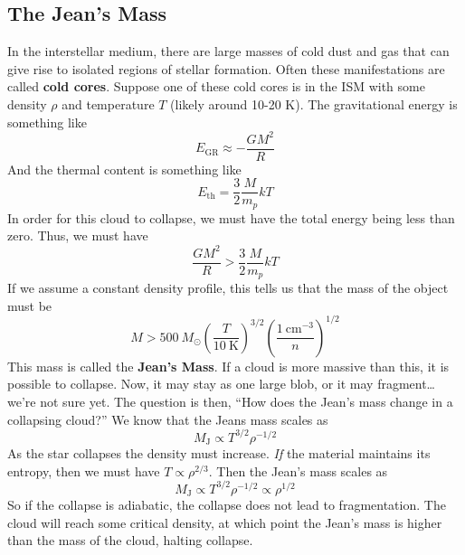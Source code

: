 \documentclass[10pt]{article}
\numberwithin{equation}{section}
\begin{document}
\subsection{The Jean's Mass}

  In the interstellar medium, there are large masses of cold dust and
  gas that can give rise to isolated regions of stellar formation. Often
  these manifestations are called \textbf{cold cores}. Suppose one of
  these cold cores is in the ISM with some density $\rho$ and
  temperature $T$ (likely around 10-20 K). The gravitational energy is
  something like
  \begin{equation}
    \label{eq:59}
    E_{\mathrm{GR}}\approx -\frac{GM^2}{R}
  \end{equation}
  And the thermal content is something like
  \begin{equation}
    \label{eq:60}
    E_{\mathrm{th}}=\frac{3}{2}\frac{M}{m_p}kT
  \end{equation}
  In order for this cloud to collapse, we must have the total energy
  being less than zero. Thus, we must have
  \begin{equation}
    \label{eq:61}
    \frac{GM^2}{R}>\frac{3}{2}\frac{M}{m_p}kT
  \end{equation}
  If we assume a constant density profile, this tells us that the mass
  of the object must be
  \begin{equation}
    \label{eq:62}
    M>500\ M_\odot\left(\frac{T}{10\
        \mathrm{K}}\right)^{3/2}\left(\frac{1\ \mathrm{cm}^{-3}}{n}\right)^{1/2}
  \end{equation}
  This mass is called the \textbf{Jean's Mass}. If a cloud is more
  massive than this, it is possible to collapse. Now, it may stay as
  one large blob, or it may fragment\ldots we're not sure yet. The
  question is then, ``How does the Jean's mass change in a collapsing
  cloud?'' We know that the Jeans mass scales as
  \begin{equation}
    \label{eq:63}
    M_\mathrm{J}\propto T^{3/2}\rho^{-1/2}
  \end{equation}
  As the star collapses the density must increase. \emph{If} the
  material maintains its entropy, then we must have $T\propto
  \rho^{2/3}$. Then the Jean's mass scales as
  \begin{equation}
    \label{eq:64}
    M_{\mathrm{J}}\propto T^{3/2}\rho^{-1/2}\propto\rho^{1/2}
  \end{equation}
  So if the collapse is adiabatic, the collapse does not lead to
  fragmentation. The cloud will reach some critical density, at which
  point the Jean's mass is higher than the mass of the cloud, halting
  collapse.\\
\end{document}
